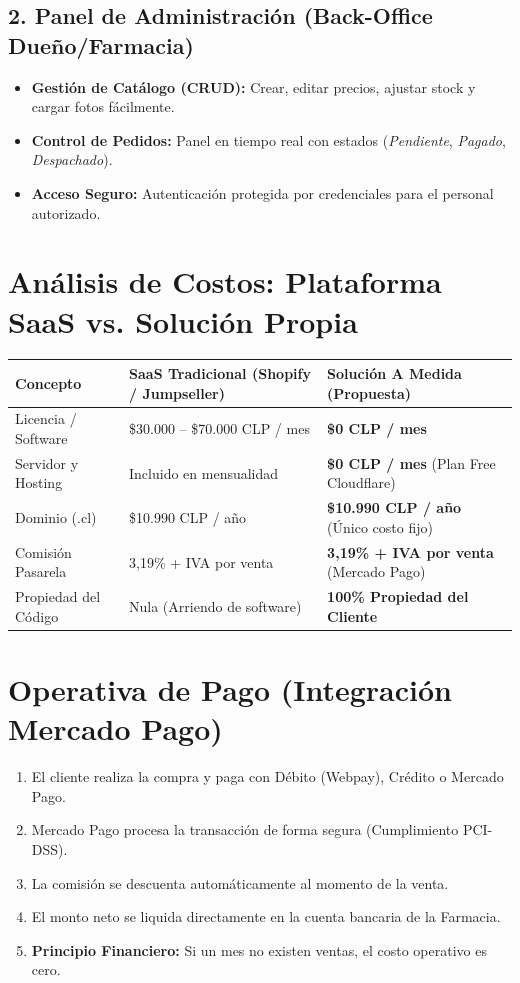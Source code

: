 \documentclass[11pt,a4paper]{article}
\begin{document}
\subsection{2. Panel de Administración (Back-Office Dueño/Farmacia)}
\begin{itemize}[leftmargin=1.5em]
    \item \textbf{Gestión de Catálogo (CRUD):} Crear, editar precios, ajustar stock y cargar fotos fácilmente.
    \item \textbf{Control de Pedidos:} Panel en tiempo real con estados (\textit{Pendiente}, \textit{Pagado}, \textit{Despachado}).
    \item \textbf{Acceso Seguro:} Autenticación protegida por credenciales para el personal autorizado.
\end{itemize}

\section{Análisis de Costos: Plataforma SaaS vs. Solución Propia}

\begin{table}[h!]
\centering
\small
\begin{tabular}{lll}
\toprule
\textbf{Concepto} & \textbf{SaaS Tradicional (Shopify / Jumpseller)} & \textbf{Solución A Medida (Propuesta)} \\
\midrule
Licencia / Software & \$30.000 -- \$70.000 CLP / mes & \textbf{\$0 CLP / mes} \\
Servidor y Hosting & Incluido en mensualidad & \textbf{\$0 CLP / mes} (Plan Free Cloudflare) \\
Dominio (.cl) & \$10.990 CLP / año & \textbf{\$10.990 CLP / año} (Único costo fijo) \\
Comisión Pasarela & 3,19\% + IVA por venta & \textbf{3,19\% + IVA por venta} (Mercado Pago) \\
Propiedad del Código & Nula (Arriendo de software) & \textbf{100\% Propiedad del Cliente} \\
\bottomrule
\end{tabular}
\end{table}

\section{Operativa de Pago (Integración Mercado Pago)}
\begin{enumerate}[leftmargin=1.5em]
    \item El cliente realiza la compra y paga con Débito (Webpay), Crédito o Mercado Pago.
    \item Mercado Pago procesa la transacción de forma segura (Cumplimiento PCI-DSS).
    \item La comisión se descuenta automáticamente al momento de la venta.
    \item El monto neto se liquida directamente en la cuenta bancaria de la Farmacia.
    \item \textbf{Principio Financiero:} Si un mes no existen ventas, el costo operativo es cero.
\end{enumerate}
\end{document}
